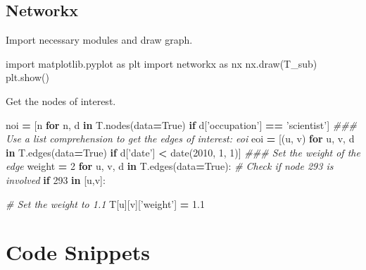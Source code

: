 \documentclass[]{book}
\newenvironment{Shaded}{\begin{snugshade}}{\end{snugshade}}
\newcommand{\KeywordTok}[1]{\textcolor[rgb]{0.13,0.29,0.53}{\textbf{#1}}}
\newcommand{\DecValTok}[1]{\textcolor[rgb]{0.00,0.00,0.81}{#1}}
\newcommand{\FloatTok}[1]{\textcolor[rgb]{0.00,0.00,0.81}{#1}}
\newcommand{\StringTok}[1]{\textcolor[rgb]{0.31,0.60,0.02}{#1}}
\newcommand{\ImportTok}[1]{#1}
\newcommand{\CommentTok}[1]{\textcolor[rgb]{0.56,0.35,0.01}{\textit{#1}}}
\newcommand{\VariableTok}[1]{\textcolor[rgb]{0.00,0.00,0.00}{#1}}
\newcommand{\ControlFlowTok}[1]{\textcolor[rgb]{0.13,0.29,0.53}{\textbf{#1}}}
\newcommand{\OperatorTok}[1]{\textcolor[rgb]{0.81,0.36,0.00}{\textbf{#1}}}
\newcommand{\NormalTok}[1]{#1}
\theoremstyle{definition}
\theoremstyle{definition}
\theoremstyle{definition}
\theoremstyle{remark}
\begin{document}
\section{Networkx}\label{networkx}

Import necessary modules and draw graph.

\begin{Shaded}
\begin{Highlighting}[]
\ImportTok{import}\NormalTok{ matplotlib.pyplot }\ImportTok{as}\NormalTok{ plt}
\ImportTok{import}\NormalTok{ networkx }\ImportTok{as}\NormalTok{ nx}
\NormalTok{nx.draw(T_sub)}
\NormalTok{plt.show()}
\end{Highlighting}
\end{Shaded}

Get the nodes of interest.

\begin{Shaded}
\begin{Highlighting}[]
\NormalTok{noi }\OperatorTok{=}\NormalTok{ [n }\ControlFlowTok{for}\NormalTok{ n, d }\KeywordTok{in}\NormalTok{ T.nodes(data}\OperatorTok{=}\VariableTok{True}\NormalTok{) }\ControlFlowTok{if}\NormalTok{ d[}\StringTok{'occupation'}\NormalTok{] }\OperatorTok{==} \StringTok{'scientist'}\NormalTok{]}
\CommentTok{### Use a list comprehension to get the edges of interest: eoi}
\NormalTok{eoi }\OperatorTok{=}\NormalTok{ [(u, v) }\ControlFlowTok{for}\NormalTok{ u, v, d }\KeywordTok{in}\NormalTok{ T.edges(data}\OperatorTok{=}\VariableTok{True}\NormalTok{) }\ControlFlowTok{if}\NormalTok{ d[}\StringTok{'date'}\NormalTok{] }\OperatorTok{<}\NormalTok{ date(}\DecValTok{2010}\NormalTok{, }\DecValTok{1}\NormalTok{, }\DecValTok{1}\NormalTok{)]}
\CommentTok{### Set the weight of the edge}
\NormalTok{weight }\OperatorTok{=} \DecValTok{2}
\ControlFlowTok{for}\NormalTok{ u, v, d }\KeywordTok{in}\NormalTok{ T.edges(data}\OperatorTok{=}\VariableTok{True}\NormalTok{):}
  \CommentTok{# Check if node 293 is involved}
  \ControlFlowTok{if} \DecValTok{293} \KeywordTok{in}\NormalTok{ [u,v]:}
    
    \CommentTok{# Set the weight to 1.1}
\NormalTok{    T[u][v][}\StringTok{'weight'}\NormalTok{] }\OperatorTok{=} \FloatTok{1.1}
\end{Highlighting}
\end{Shaded}

\chapter{Code Snippets}\label{code-snippets}
\end{document}
